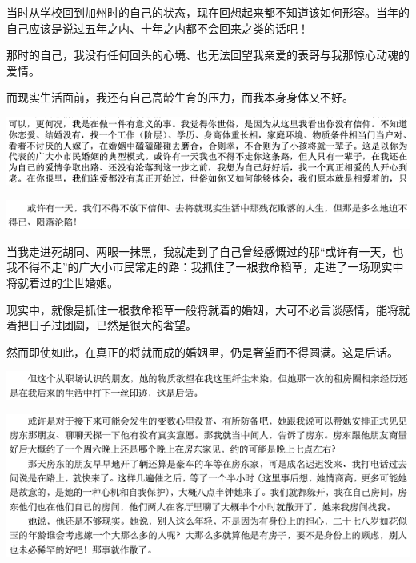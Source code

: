 \documentclass[9pt, b5paper]{article}
\begin{document}
当时从学校回到加州时的自己的状态，现在回想起来都不知道该如何形容。当年的自己应该是说过五年之内、十年之内都不会回来之类的话吧！

那时的自己，我没有任何回头的心境、也无法回望我亲爱的表哥与我那惊心动魂的爱情。 

而现实生活面前，我还有自己高龄生育的压力，而我本身身体又不好。

\begin{center}
\includegraphics[width=.9\linewidth]{./pic/backups_plans_20210424_095212.png}
\end{center}

\begin{center}
\includegraphics[width=.9\linewidth]{./pic/backups_plans_20210424_095046.png}
\end{center}

当我走进死胡同、两眼一抹黑，我就走到了自己曾经感慨过的那“或许有一天，也我不得不走”的广大小市民常走的路：我抓住了一根救命稻草，走进了一场现实中将就着过的尘世婚姻。

现实中，就像是抓住一根救命稻草一般将就着的婚姻，大可不必言谈感情，能将就着把日子过团圆，已然是很大的奢望。

然而即使如此，在真正的将就而成的婚姻里，仍是奢望而不得圆满。这是后话。

\begin{center}
\includegraphics[width=.9\linewidth]{./pic/backups_plans_20210423_204215.png}
\end{center}

\begin{center}
\includegraphics[width=.9\linewidth]{./pic/backups_plans_20210423_204134.png}
\end{center}
\end{document}
